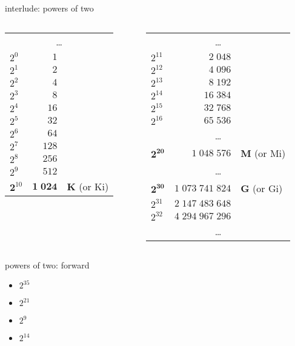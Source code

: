 \begin{frame}[t]{interlude: powers of two}
\begin{columns}[t]
\begin{column}{0.5\textwidth}
\small
\begin{tabular}{lrl}
\multicolumn{3}{c}{\ldots} \\
$2^0$ & $1$ & \\
$2^1$ & $2$ & \\
$2^2$ & $4$ & \\
$2^3$ & $8$ & \\
$2^4$ & $16$ & \\
$2^5$ & $32$ & \\
$2^6$ & $64$ & \\
$2^7$ & $128$ & \\
$2^8$ & $256$ & \\
$2^9$ & $512$ & \\
$\mathbf 2^{10}$ & $\mathbf{1\;024}$ & {\bf K} (or Ki) \\
\end{tabular}
\end{column}
\begin{column}{0.5\textwidth}
\small
\begin{tabular}{lrl}
\multicolumn{3}{c}{\ldots} \\
$2^{11}$ & $2\;048$ & \\
$2^{12}$ & $4\;096$ & \\
$2^{13}$ & $8\;192$ & \\
$2^{14}$ & $16\;384$ & \\
$2^{15}$ & $32\;768$ & \\
$2^{16}$ & $65\;536$ & \\
\multicolumn{3}{c}{\ldots} \\
$\mathbf{2^{20}}$ & $1\;048\;576$ & {\bf M} (or Mi) \\
\multicolumn{3}{c}{\ldots} \\
$\mathbf{2^{30}}$ & $1\;073\;741\;824$ & {\bf G} (or Gi) \\
$2^{31}$ & ${2\;147\;483\;648}$ & \\
$2^{32}$ & ${4\;294\;967\;296}$ & \\
\multicolumn{3}{c}{\ldots} \\
\end{tabular}
\end{column}
\end{columns}
\end{frame}

\begin{frame}{powers of two: forward}
\begin{itemize}
    \item<1-> $2^{35}$ 
    \item<1-> $2^{21}$ 
    \item<1-> $2^{9}$ 
    \item<1-> $2^{14}$ 
\end{itemize}
\end{frame}

